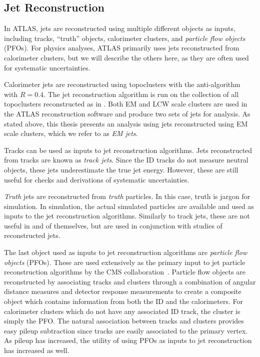 \subsection{Jet Reconstruction}

In ATLAS, jets are reconstructed using multiple different objects as inputs, including tracks, ``truth'' objects, calorimeter clusters, and \textit{particle flow objects} (PFOs).
For physics analyses, ATLAS primarily uses jets reconstructed from calorimeter clusters, but we will describe the others here, as they are often used for systematic uncertainties.

Calorimeter jets are reconstructed using topoclusters with the anti-\kt algorithm with $R = 0.4$.
The jet reconstruction algorithm is run on the collection of all topoclusters reconstructed as in .
Both EM and LCW scale clusters are used in the ATLAS reconstruction software and produce two sets of jets for analysis.
As stated above, this thesis presents an analysis using jets reconstructed using EM scale clusters, which we refer to as \textit{EM jets}.

Tracks can be used as inputs to jet reconstruction algorithms.
Jets reconstructed from tracks are known as \textit{track jets}.
Since the ID tracks do not measure neutral objects, these jets underestimate the true jet energy.
However, these are still useful for checks and derivations of systematic uncertainties.

\textit{Truth} jets are reconstructed from \textit{truth} particles.
In this case, truth is jargon for simulation.
In simulation, the actual simulated particles are available and used as inputs to the jet reconstruction algorithms.
Similarly to track jets, these are not useful in and of themselves, but are used in conjunction with studies of reconstructed jets.

The last object used as inputs to jet reconstruction algorithms are \textit{particle flow objects} (PFOs).
These are used extensively as the primary input to jet particle reconstruction algorithms by the CMS collaboration~\cite{CMS:2009nxa}.
Particle flow objects are reconstructed by associating tracks and clusters through a combination of angular distance measures and detector response measurements to create a composite object which contains information from both the ID and the calorimeters.
For calorimeter clusters which do not have any associated ID track, the cluster is simply the PFO.
The natural association between tracks and clusters provides easy pileup subtraction since tracks are easily associated to the primary vertex.
As pileup has increased, the utility of using PFOs as inputs to jet reconstruction has increased as well.


